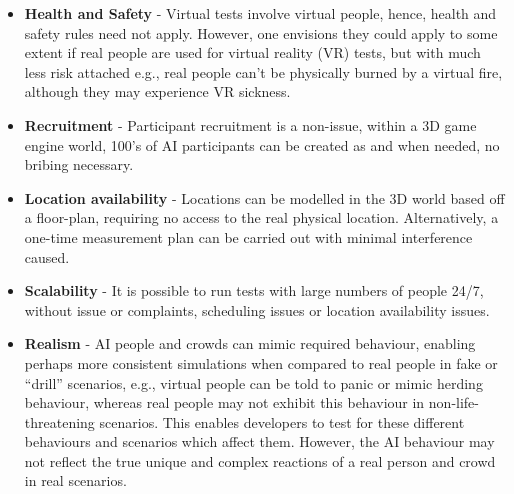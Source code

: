 \begin{itemize}
  \item \textbf{Health and Safety} - Virtual tests involve virtual people, hence, health and safety rules need not apply. However, one envisions they could apply to some extent if real people are used for virtual reality (VR) tests, but with much less risk attached e.g., real people can't be physically burned by a virtual fire, although they may experience VR sickness.

  \item \textbf{Recruitment} - Participant recruitment is a non-issue, within a 3D game engine world, 100's of AI participants can be created as and when needed, no bribing necessary.

  \item \textbf{Location availability} - Locations can be modelled in the 3D world based off a floor-plan, requiring no access to the real physical location. Alternatively, a one-time measurement plan can be carried out with minimal interference caused.

  \item \textbf{Scalability} - It is possible to run tests with large numbers of people 24/7, without issue or complaints, scheduling issues or location availability issues.

  \item \textbf{Realism} - AI people and crowds can mimic required behaviour, enabling perhaps more consistent simulations when compared to real people in fake or ``drill'' scenarios, e.g., virtual people can be told to panic or mimic herding behaviour, whereas real people may not exhibit this behaviour in non-life-threatening scenarios. This enables developers to test for these different behaviours and scenarios which affect them. However, the AI behaviour may not reflect the true unique and complex reactions of a real person and crowd in real scenarios.
\end{itemize}

